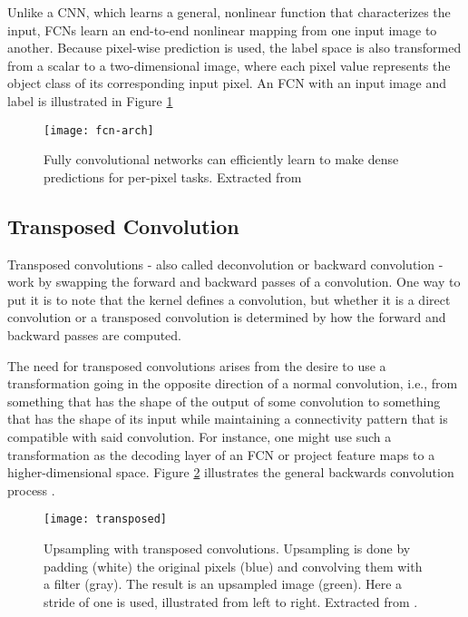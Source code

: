 Unlike a CNN, which learns a general, nonlinear function that characterizes the input, FCNs learn an end-to-end nonlinear mapping from one input image to another. Because pixel-wise prediction is used, the label space is also transformed from a scalar to a two-dimensional image, where each pixel value represents the object class of its corresponding input pixel. An FCN with an input image and label is illustrated in Figure \ref{fcn-arch}


\begin{figure}[!htb]
\centering
\texttt{[image: fcn-arch]}
\caption{Fully convolutional networks can efficiently learn to make dense predictions for
per-pixel tasks. Extracted from \cite{long2015fully}}
\label{fcn-arch}
\end{figure}

\subsection{Transposed Convolution}

Transposed convolutions - also called deconvolution or backward convolution - work
by swapping the forward and backward passes of a convolution. One way to put
it is to note that the kernel defines a convolution, but whether it is a direct
convolution or a transposed convolution is determined by how the forward and
backward passes are computed.

The need for transposed convolutions arises from the desire to use a
transformation going in the opposite direction of a normal convolution, i.e., from
something that has the shape of the output of some convolution to something
that has the shape of its input while maintaining a connectivity pattern that
is compatible with said convolution. For instance, one might use such a transformation
as the decoding layer of an FCN or project feature maps to a higher-dimensional space. Figure \ref{fig:transposed} illustrates the general backwards convolution process \cite{dumoulin2016guide}.

\begin{figure}[!htb]
\centering
\texttt{[image: transposed]}

\caption{Upsampling with transposed convolutions. Upsampling is done by padding
(white) the original pixels (blue) and convolving them with a filter (gray). The result is
an upsampled image (green). Here a stride of one is used, illustrated from left to right. Extracted from \cite{dumoulin2016guide}.} \label{fig:transposed}
\end{figure}

